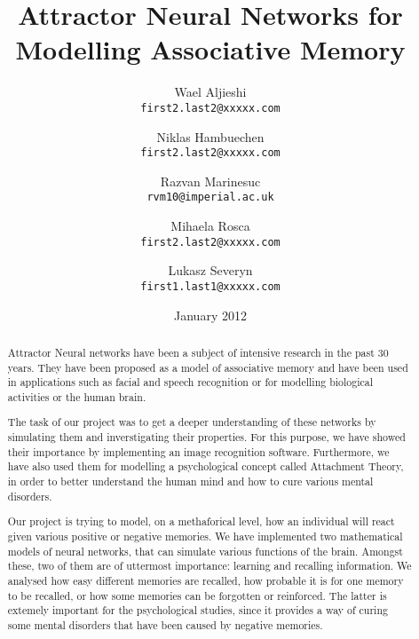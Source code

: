 \documentclass[11pt,a4paper,oneside]{report}
\title{Attractor Neural Networks for Modelling Associative Memory}
\date{January 2012}
\author{
  Wael Aljieshi\\
  \texttt{first2.last2@xxxxx.com}
  \and
  Niklas Hambuechen\\
  \texttt{first2.last2@xxxxx.com}
  \and
  Razvan Marinesuc\\
  \texttt{rvm10@imperial.ac.uk}
  \and
  Mihaela Rosca\\
  \texttt{first2.last2@xxxxx.com}
  \and
  Lukasz Severyn\\
  \texttt{first1.last1@xxxxx.com}
}
\begin{document}







\maketitle{}


\renewcommand{\abstractname}{Executive Summary}
\begin{abstract}

Attractor Neural networks have been a subject of intensive research in the past 30 years. They have been proposed as a model of associative memory and have been used in applications such as facial and speech recognition or for modelling biological activities or the human brain. 


The task of our project was to get a deeper understanding of these networks by simulating them and inverstigating their properties. For this purpose, we have showed their importance by implementing an image recognition software. Furthermore, we have also used them for modelling a psychological concept called Attachment Theory, in order to better understand the human mind and how to cure various mental disorders. 

Our project is trying to model, on a methaforical level, how an individual will react given various positive or negative memories. We have implemented two mathematical models of neural networks, that can simulate various functions of the brain. Amongst these, two of them are of uttermost importance: learning and recalling information. We analysed how easy different memories are recalled, how probable it is for one memory to be recalled, or how some memories can be forgotten or reinforced. The latter is extemely important for the psychological studies, since it provides a way of curing some mental disorders that have been caused by negative memories. 

\end{abstract}
\end{document}
